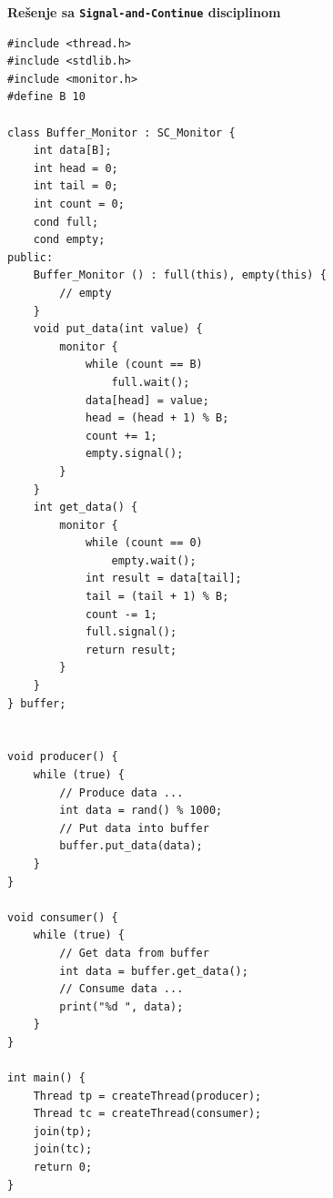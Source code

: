 \textbf{Re\v{s}enje sa \texttt{Signal-and-Continue} disciplinom}
\begin{lstlisting}
#include <thread.h>
#include <stdlib.h>
#include <monitor.h>
#define B 10

class Buffer_Monitor : SC_Monitor {
    int data[B];
    int head = 0;
    int tail = 0;
    int count = 0;
    cond full;
    cond empty;
public:
    Buffer_Monitor () : full(this), empty(this) {
        // empty
    }
    void put_data(int value) {
        monitor {
            while (count == B)
                full.wait();
            data[head] = value;
            head = (head + 1) % B;
            count += 1;
            empty.signal();
        }
    }
    int get_data() {
        monitor {
            while (count == 0)
                empty.wait();
            int result = data[tail];
            tail = (tail + 1) % B;
            count -= 1;
            full.signal();
            return result;
        }
    }
} buffer;


void producer() {
    while (true) {
        // Produce data ...
        int data = rand() % 1000;
        // Put data into buffer
        buffer.put_data(data);
    }
}

void consumer() {
    while (true) {
        // Get data from buffer
        int data = buffer.get_data();
        // Consume data ...
        print("%d ", data);
    }
}

int main() {
    Thread tp = createThread(producer);
    Thread tc = createThread(consumer);
    join(tp);
    join(tc);
    return 0;
}

\end{lstlisting}
